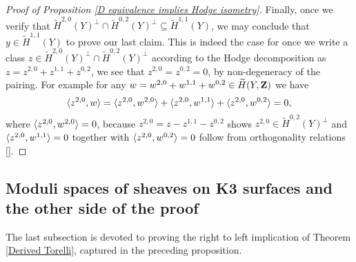 \begin{proof}[Proof of Proposition \ref{D equivalence implies Hodge isometry}]
    Finally, once we verify that $\widetilde{H}^{2,0}(Y)^\perp \cap \widetilde{H}^{0,2}(Y)^\perp \subseteq \widetilde{H}^{1,1}(Y)$, we may conclude that $y \in \widetilde{H}^{1,1}(Y)$ to prove our last claim.
    This is indeed the case for once we write a class $z \in \widetilde{H}^{2,0}(Y)^\perp \cap \widetilde{H}^{0,2}(Y)^\perp$ according to the Hodge decomposition as $z = z^{2,0} + z^{1,1} + z^{0,2}$, we see that $z^{2,0} = z^{0,2} = 0$, by non-degeneracy of the pairing. For example for any $w = w^{2,0} + w^{1,1} + w^{0,2} \in \widetilde{H}(Y, \mathbf Z)$ we have
    \[
        \langle z^{2,0}, w \rangle = \langle z^{2,0}, w^{2,0} \rangle + \langle z^{2,0}, w^{1,1} \rangle + \langle z^{2,0}, w^{0,2} \rangle = 0,
    \]
    where $\langle z^{2,0}, w^{2,0} \rangle = 0$, because $z^{2,0} = z - z^{1,1} - z^{0,2}$ shows $z^{2,0} \in \widetilde{H}^{0,2}(Y)^\perp$ and $\langle z^{2,0}, w^{1,1} \rangle = 0$ together with $\langle z^{2,0}, w^{0,2} \rangle = 0$ follow from orthogonality relations \eqref{}. \qedhere
    
    
    
    
\end{proof}

\subsection{Moduli spaces of sheaves on K3 surfaces and the other side of the proof}

The last subsection is devoted to proving the right to left implication of Theorem \ref{Derived Torelli}, captured in the preceding proposition.

